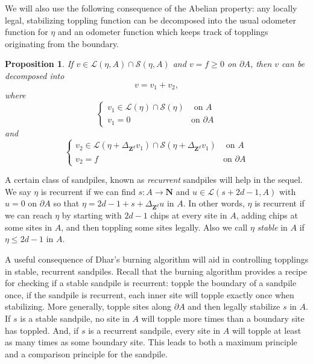 \documentclass[12pt]{amsart}
\newcommand{\Z}{\mathbf{Z}}
\newcommand{\N}{\mathbf{N}}
\newtheorem{prop}{Proposition}[section]
\begin{document}
We will also use the following consequence of the Abelian property:  any locally legal, stabilizing toppling function 
can be decomposed into the usual odometer function for $\eta$ and an odometer function
which keeps track of topplings originating from the boundary. 
\begin{prop} \label{Abelian}
	If $v \in \mathcal{L}(\eta,A ) \cap \mathcal{S}(\eta, A)$ and $v = f \geq 0$ on $\partial A$, then $v$ can be decomposed into
	\[
	v = v_1 + v_2, 
	\]
	where
	\[
	\begin{cases}
	v_1 \in \mathcal{L}(\eta) \cap \mathcal{S}(\eta)  &\mbox{ on $A$} \\
	v_1 = 0 & \mbox{on $\partial A$} 
	\end{cases}
	\]
	and
	\[
	\begin{cases}
	v_2 \in \mathcal{L}(\eta + \Delta_{\Z^d} v_1) \cap \mathcal{S}(\eta + \Delta_{\Z^d} v_1)  &\mbox{ on $A$} \\
	v _2= f & \mbox{on $\partial A$} 
	\end{cases}
	\]
\end{prop}


A certain class of sandpiles, known as {\it recurrent} sandpiles will help in the sequel. We say $\eta$ is recurrent if we can find $s: A \to \N$ and $u \in \mathcal{L}(s + 2 d - 1, A)$ with $u = 0$ on $\partial A$ so that $\eta = 2 d- 1 + s + \Delta_{\Z^d} u$ in $A$. In other words, $\eta$ is recurrent if we can reach $\eta$ by starting with $2d-1$ chips at every site in $A$, adding chips at some sites in $A$, and then toppling some sites legally. Also we call $\eta$  {\it stable} in $A$ if $\eta \leq 2 d-1$ in $A$.  

A useful consequence of Dhar's burning algorithm \cite{dhar1990self} will aid in controlling topplings in stable, recurrent sandpiles.  Recall that the burning algorithm provides a recipe for checking if a stable sandpile is recurrent:
topple the boundary of a sandpile once, if the sandpile is recurrent, each inner site will topple exactly once when stabilizing. More generally, topple sites along $\partial A$ and then legally stabilize $s$ in $A$. If $s$ is a stable sandpile, no site in $A$ will topple more times than a boundary site has toppled. And, if $s$ is a recurrent sandpile, every site in $A$ will topple at least as many times as some boundary site. This leads to both a maximum principle and a comparison principle for the sandpile.
\end{document}
